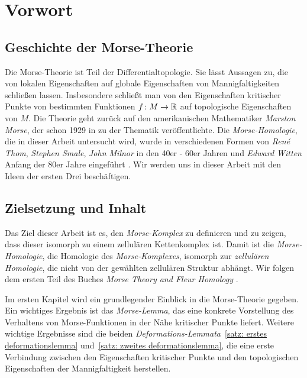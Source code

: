 \documentclass[a4paper,11pt,twoside]{scrreport}
\begin{document}
\cleardoublepage

\section*{Vorwort}

\subsection*{Geschichte der Morse-Theorie}

Die Morse-Theorie ist Teil der Differentialtopologie. Sie lässt Aussagen zu, die von lokalen 
Eigenschaften auf globale Eigenschaften von Mannigfaltigkeiten schließen lassen. Insbesondere schließt man
von den Eigenschaften kritischer Punkte von bestimmten Funktionen $f \colon M \to { \mathbb R }$ auf topologische 
Eigenschaften von $M$. 
Die Theorie geht zurück auf den amerikanischen Mathematiker \textit{Marston Morse}, 
der schon 1929 in \cite{morse} zu der Thematik veröffentlichte. Die \textit{Morse-Homologie}, die in dieser 
Arbeit untersucht wird, wurde in verschiedenen Formen von \textit{René Thom}, \textit{Stephen Smale},
\textit{John Milnor} in den 40er - 60er Jahren und \textit{Edward Witten} Anfang der 80er Jahre 
eingeführt \cite{yanfeng}. Wir werden uns in dieser Arbeit mit den Ideen der ersten Drei beschäftigen.

\subsection*{Zielsetzung und Inhalt}

Das Ziel dieser Arbeit ist es, den \textit{Morse-Komplex} zu definieren und zu zeigen, dass dieser 
isomorph zu einem zellulären Kettenkomplex ist. Damit ist die \textit{Morse-Homologie}, die Homologie des 
\textit{Morse-Komplexes}, isomorph zur \textit{zellulären Homologie}, die nicht von der gewählten 
zellulären Struktur abhängt. Wir folgen dem ersten Teil des Buches 
\textit{Morse Theory and Fleur Homology} \cite{audin}. 

Im ersten Kapitel wird ein grundlegender Einblick in die Morse-Theorie gegeben. Ein wichtiges Ergebnis ist
das \textit{Morse-Lemma}, das eine konkrete Vorstellung des Verhaltens von Morse-Funktionen in der Nähe 
kritischer Punkte liefert. Weitere wichtige Ergebnisse sind die beiden 
\textit{Deformations-Lemmata}~\ref{satz: erstes deformationslemma} und~\ref{satz: zweites deformationslemma},
die eine erste Verbindung zwischen den Eigenschaften kritischer Punkte und den topologischen Eigenschaften
der Mannigfaltigkeit herstellen.
\end{document}
